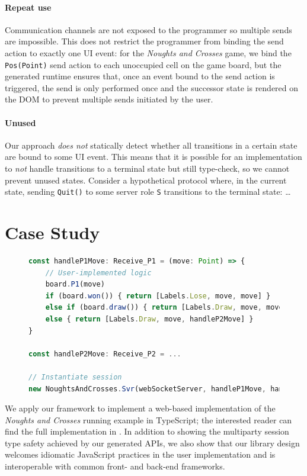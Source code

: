 \documentclass[submission,copyright,creativecommons]{eptcs}
\begin{document}
\paragraph{Repeat use} Communication channels are not exposed to the programmer so multiple sends are impossible. This does not restrict the programmer from binding the send action to exactly one UI event: for the \textit{Noughts and Crosses} game, we bind the \texttt{Pos(Point)} send action to each unoccupied cell on the game board, but the generated runtime ensures that, once an event bound to the send action is triggered, the send is only performed once and the successor state is rendered on the DOM to prevent multiple sends initiated by the user.

\paragraph{Unused} Our approach \textit{does not} statically detect whether all transitions in a certain state are bound to some UI event. This means that it is possible for an implementation to \textit{not} handle transitions to a terminal state but still type-check, so we cannot prevent unused states. Consider a hypothetical protocol where, in the current state, sending \texttt{Quit()} to some server role \texttt{S} transitions to the terminal state: \dots

\section{Case Study}
\label{section:example}

\begin{figure}
\begin{lstlisting}[language=JavaScript, tabsize=4, title=\texttt{./app.ts}]
const handleP1Move: Receive_P1 = (move: Point) => {
	// User-implemented logic
	board.P1(move)
	if (board.won()) { return [Labels.Lose, move, move] }
	else if (board.draw()) { return [Labels.Draw, move, move] }
	else { return [Labels.Draw, move, handleP2Move] } 
}

const handleP2Move: Receive_P2 = ...

// Instantiate session
new NoughtsAndCrosses.Svr(webSocketServer, handleP1Move, handleP2Move)
\end{lstlisting}  
\label{lst:svrprotocol}
\end{figure}

We apply our framework to implement a web-based implementation of the \textit{Noughts and Crosses} running example in TypeScript; the interested reader can find the full implementation in \cite{NoughtsAndCrosses}. In addition to showing the multiparty session type safety achieved by our generated APIs, we also show that our library design welcomes idiomatic JavaScript practices in the user implementation and is interoperable with common front- and back-end frameworks.
 
\end{document}
